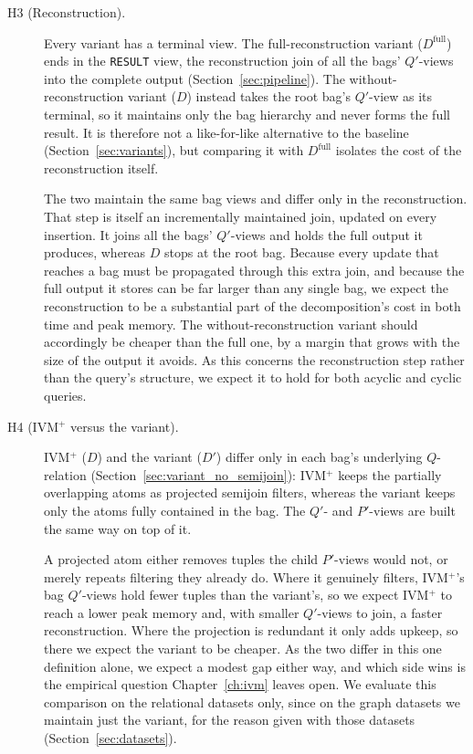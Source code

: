 \begin{description}
    \item[\hypertarget{h3}{H3 (Reconstruction).}] Every variant has a terminal view. The full-recon\-struc\-tion variant ($D^{\text{full}}$) ends in the \texttt{RESULT} view, the reconstruction join of all the bags' $Q'$-views into the complete output (Section~\ref{sec:pipeline}). The without-reconstruction variant ($D$) instead takes the root bag's $Q'$-view as its terminal, so it maintains only the bag hierarchy and never forms the full result. It is therefore not a like-for-like alternative to the baseline (Section~\ref{sec:variants}), but comparing it with $D^{\text{full}}$ isolates the cost of the reconstruction itself.

    The two maintain the same bag views and differ only in the reconstruction. That step is itself an incrementally maintained join, updated on every insertion. It joins all the bags' $Q'$-views and holds the full output it produces, whereas $D$ stops at the root bag. Because every update that reaches a bag must be propagated through this extra join, and because the full output it stores can be far larger than any single bag, we expect the reconstruction to be a substantial part of the decomposition's cost in both time and peak memory. The without-reconstruction variant should accordingly be cheaper than the full one, by a margin that grows with the size of the output it avoids. As this concerns the reconstruction step rather than the query's structure, we expect it to hold for both acyclic and cyclic queries.

    \item[\hypertarget{h4}{H4 (IVM$^+$ versus the variant).}] IVM$^+$ ($D$) and the variant ($D'$) differ only in each bag's underlying $Q$-relation (Section~\ref{sec:variant_no_semijoin}): IVM$^+$ keeps the partially overlapping atoms as projected semijoin filters, whereas the variant keeps only the atoms fully contained in the bag. The $Q'$- and $P'$-views are built the same way on top of it.

    A projected atom either removes tuples the child $P'$-views would not, or merely repeats filtering they already do. Where it genuinely filters, IVM$^+$'s bag $Q'$-views hold fewer tuples than the variant's, so we expect IVM$^+$ to reach a lower peak memory and, with smaller $Q'$-views to join, a faster reconstruction. Where the projection is redundant it only adds upkeep, so there we expect the variant to be cheaper. As the two differ in this one definition alone, we expect a modest gap either way, and which side wins is the empirical question Chapter~\ref{ch:ivm} leaves open. We evaluate this comparison on the relational datasets only, since on the graph datasets we maintain just the variant, for the reason given with those datasets (Section~\ref{sec:datasets}).


\end{description}
